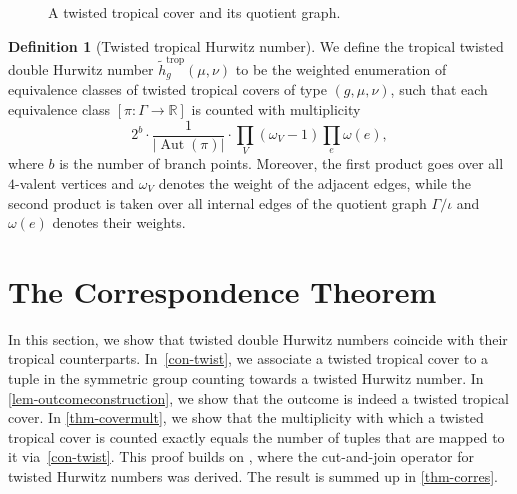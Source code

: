 \documentclass[11pt]{article}
\theoremstyle{definition}
\newtheorem{defi}[theo]{Definition}
\numberwithin{equation}{section}
\DeclareMathOperator{\Aut}{Aut}
\DeclareMathOperator{\trop}{trop}
\begin{document}
\begin{figure}
\caption{A twisted tropical cover and its quotient graph.}
\label{fig:extwist}
\end{figure}

\begin{defi}[Twisted tropical Hurwitz number]
\label{def:twisttrophn}
We define the tropical twisted double Hurwitz 
number $\tilde{h}^{\trop}_g(\mu,\nu)$ to be  the weighted enumeration of equivalence classes of twisted tropical covers of type $(g,\mu,\nu)$, such that each equivalence class $[\pi\colon \Gamma\to\mathbb{R}]$ is counted with multiplicity
\begin{equation*}
    2^{b}\cdot \frac{1}{|\Aut(\pi)|}\cdot\prod_V (\omega_V-1)\prod_e\omega(e),
\end{equation*}
where $b$ is the number of branch points. Moreover, the first product goes over all $4$-valent vertices and $\omega_V$ denotes the weight of the adjacent edges, while the second product is taken over all internal edges of the quotient graph $\Gamma/\iota$ and $\omega(e)$ denotes their weights.
\end{defi}

\section{The Correspondence Theorem}
\label{sec:corr}
In this section, we show that  twisted double Hurwitz numbers coincide with their tropical counterparts.
In~\cref{con-twist}, we associate a twisted tropical cover to a tuple in the symmetric group counting towards a twisted Hurwitz number. In \cref{lem-outcomeconstruction}, we show that the outcome is indeed a twisted tropical cover. In \cref{thm-covermult}, we show that the multiplicity with which a twisted tropical cover is counted exactly equals the number of tuples that are mapped to it via~\cref{con-twist}. This proof builds on \cite[Theorem 2.12]{BF21}, where the cut-and-join operator for twisted Hurwitz numbers was derived.
The result is summed up in \cref{thm-corres}.
\end{document}
